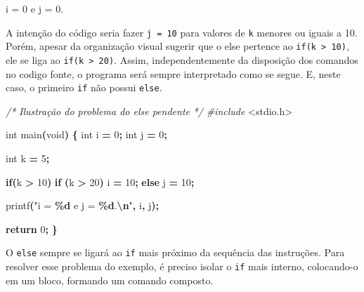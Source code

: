 \documentclass[
  11pt,
  a4paper,
]{scrbook}
\newenvironment{Shaded}{\begin{snugshade}}{\end{snugshade}}
\newcommand{\CommentTok}[1]{\textcolor[rgb]{0.56,0.35,0.01}{\textit{#1}}}
\newcommand{\ControlFlowTok}[1]{\textcolor[rgb]{0.13,0.29,0.53}{\textbf{#1}}}
\newcommand{\DataTypeTok}[1]{\textcolor[rgb]{0.13,0.29,0.53}{#1}}
\newcommand{\DecValTok}[1]{\textcolor[rgb]{0.00,0.00,0.81}{#1}}
\newcommand{\ImportTok}[1]{#1}
\newcommand{\NormalTok}[1]{#1}
\newcommand{\OperatorTok}[1]{\textcolor[rgb]{0.81,0.36,0.00}{\textbf{#1}}}
\newcommand{\PreprocessorTok}[1]{\textcolor[rgb]{0.56,0.35,0.01}{\textit{#1}}}
\newcommand{\SpecialCharTok}[1]{\textcolor[rgb]{0.81,0.36,0.00}{\textbf{#1}}}
\newcommand{\StringTok}[1]{\textcolor[rgb]{0.31,0.60,0.02}{#1}}
\begin{document}
\begin{Shaded}
\begin{Highlighting}[]
\NormalTok{i = 0 e j = 0.}
\end{Highlighting}
\end{Shaded}

A intenção do código seria fazer \texttt{j\ =\ 10} para valores de
\texttt{k} menores ou iguais a 10. Porém, apesar da organização visual
sugerir que o else pertence ao \texttt{if(k\ \textgreater{}\ 10)}, ele
se liga ao \texttt{if(k\ \textgreater{}\ 20)}. Assim, independentemente
da disposição dos comandos no codigo fonte, o programa será sempre
interpretado como se segue. E, neste caso, o primeiro \texttt{if} não
possui \texttt{else}.

\begin{Shaded}
\begin{Highlighting}[]
\CommentTok{/*}
\CommentTok{Ilustração do problema do else pendente}
\CommentTok{*/}
\PreprocessorTok{\#include }\ImportTok{\textless{}stdio.h\textgreater{}}

\DataTypeTok{int}\NormalTok{ main}\OperatorTok{(}\DataTypeTok{void}\OperatorTok{)} \OperatorTok{\{}
    \DataTypeTok{int}\NormalTok{ i }\OperatorTok{=} \DecValTok{0}\OperatorTok{;}
    \DataTypeTok{int}\NormalTok{ j }\OperatorTok{=} \DecValTok{0}\OperatorTok{;}

    \DataTypeTok{int}\NormalTok{ k }\OperatorTok{=} \DecValTok{5}\OperatorTok{;}

    \ControlFlowTok{if}\OperatorTok{(}\NormalTok{k }\OperatorTok{\textgreater{}} \DecValTok{10}\OperatorTok{)}
        \ControlFlowTok{if} \OperatorTok{(}\NormalTok{k }\OperatorTok{\textgreater{}} \DecValTok{20}\OperatorTok{)}
\NormalTok{            i }\OperatorTok{=} \DecValTok{10}\OperatorTok{;}
        \ControlFlowTok{else} 
\NormalTok{            j }\OperatorTok{=} \DecValTok{10}\OperatorTok{;}

\NormalTok{    printf}\OperatorTok{(}\StringTok{"i = }\SpecialCharTok{\%d}\StringTok{ e j = }\SpecialCharTok{\%d}\StringTok{.}\SpecialCharTok{\textbackslash{}n}\StringTok{"}\OperatorTok{,}\NormalTok{ i}\OperatorTok{,}\NormalTok{ j}\OperatorTok{);}
    
    \ControlFlowTok{return} \DecValTok{0}\OperatorTok{;}
\OperatorTok{\}}
\end{Highlighting}
\end{Shaded}

O \texttt{else} sempre se ligará ao \texttt{if} mais próximo da
sequência das instruções. Para resolver esse problema do exemplo, é
preciso isolar o \texttt{if} mais interno, colocando-o em um bloco,
formando um comando composto.
\end{document}
